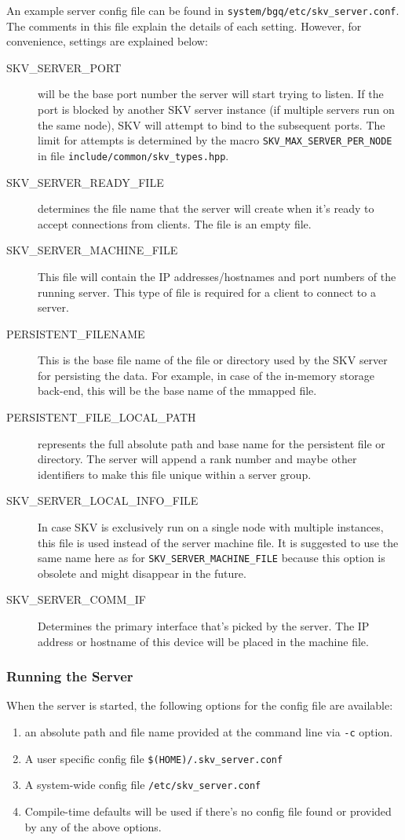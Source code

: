 An example server config file can be found in
\verb|system/bgq/etc/skv_server.conf|.  The comments in this file
explain the details of each setting.  However, for convenience,
settings are explained below:
\begin{description}
\item[SKV\_SERVER\_PORT] will be the base port number the server will
  start trying to listen.  If the port is blocked by another SKV
  server instance (\abrEG if multiple servers run on the same node),
  SKV will attempt to bind to the subsequent ports.  The limit for
  attempts is determined by the macro \verb|SKV_MAX_SERVER_PER_NODE|
  in file \verb|include/common/skv_types.hpp|.
\item[SKV\_SERVER\_READY\_FILE] determines the file name that the
  server will create when it's ready to accept connections from
  clients.  The file is an empty file.
\item[SKV\_SERVER\_MACHINE\_FILE] This file will contain the IP
  addresses/hostnames and port numbers of the running server.  This
  type of file is required for a client to connect to a server.
\item[PERSISTENT\_FILENAME] This is the base file name of the file or
  directory used by the SKV server for persisting the data.  For
  example, in case of the in-memory storage back-end, this will be the
  base name of the mmapped file.
\item[PERSISTENT\_FILE\_LOCAL\_PATH] represents the full absolute path
  and base name for the persistent file or directory.  The server will
  append a rank number and maybe other identifiers to make this file
  unique within a server group.
\item[SKV\_SERVER\_LOCAL\_INFO\_FILE] In case SKV is exclusively run
  on a single node with multiple instances, this file is used instead
  of the server machine file.  It is suggested to use the same name
  here as for \verb|SKV_SERVER_MACHINE_FILE| because this option is
  obsolete and might disappear in the future.
\item[SKV\_SERVER\_COMM\_IF] Determines the primary interface that's
  picked by the server.  The IP address or hostname of this device
  will be placed in the machine file.
\end{description}


\subsubsection{Running the Server}\label{sec:skv:run:server}
When the server is started, the following options for the config file
are available:
\begin{enumerate}
\item an absolute path and file name provided at the command line via
  \verb|-c| option.
\item A user specific config file \verb|$(HOME)/.skv_server.conf|
\item A system-wide config file \verb|/etc/skv_server.conf|
\item Compile-time defaults will be used if there's no config file
  found or provided by any of the above options.
\end{enumerate}



